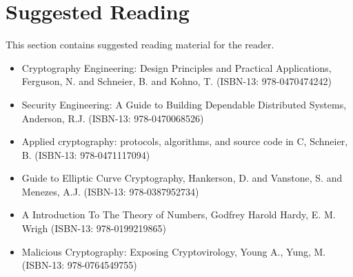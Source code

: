 \section{Suggested Reading}
\label{section:Suggested_Reading}
This section contains suggested reading material for the reader.

\begin{itemize}
	\item Cryptography Engineering: Design Principles and Practical Applications, Ferguson, N. and Schneier, B. and Kohno, T. (ISBN-13: 978-0470474242)
	\item Security Engineering: A Guide to Building Dependable Distributed Systems, Anderson, R.J. (ISBN-13: 978-0470068526)
	\item Applied cryptography: protocols, algorithms, and source code in C, Schneier, B. (ISBN-13: 978-0471117094)
	\item Guide to Elliptic Curve Cryptography, Hankerson, D. and Vanstone, S. and Menezes, A.J. (ISBN-13: 978-0387952734)
	\item A Introduction To The Theory of Numbers, Godfrey Harold Hardy, E. M. Wrigh (ISBN-13: 978-0199219865)
	\item Malicious Cryptography: Exposing Cryptovirology, Young A., Yung, M. (ISBN-13: 978-0764549755)
\end{itemize}

